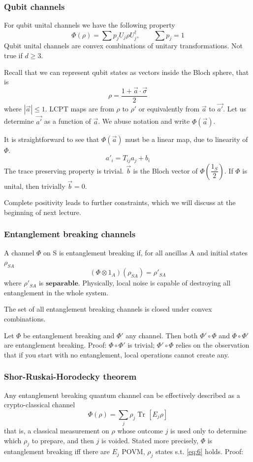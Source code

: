 \documentclass[a4paper, 11pt]{article}
\newcommand{\Tr}{\mathop{\mathrm{Tr}\!}{}}
\begin{document}
	\subsubsection{Qubit channels}
	For qubit unital channels we have the following property
	\[ \Phi(\rho) = \sum p_j U_j \rho U_j^\dagger,\qquad \sum p_j = 1 \]
	Qubit unital channels are convex combinations of unitary transformations. Not true if $d\ge 3$.
	
	Recall that we can represent qubit states as vectors inside the Bloch sphere, that is
	\[ \rho = \dfrac{1+\vec{a}\cdot\vec{\sigma}}{2} \]
	where $|\vec{a}|\le 1$. LCPT maps are from $\rho$ to $\rho'$ or equivalently from $\vec{a}$ to $\vec{a'}$.
	Let us determine $\vec{a'}$ as a function of $\vec{a}$. We abuse notation and write $\Phi(\vec{a})$.
	
	It is straightforward to see that $\Phi(\vec{a})$ must be a linear map, due to linearity of $\Phi$.
	\[ a'_i = T_{ij} a_j + b_i \]
	The trace preserving property is trivial. $\vec{b}$ is the Bloch vector of $\Phi\left(\dfrac{1_S}{2}\right)$. If $\Phi$ is unital, then trivially $\vec{b} = 0$.
	
	Complete positivity leads to further constraints, which we will discuss at the beginning of next lecture.
	
	
	\subsubsection{Entanglement breaking channels}
	A channel $\Phi$ on S is entanglement breaking if, for all ancillas A and initial states $\rho_{SA}$
	\[ (\Phi\otimes 1_A)(\rho_{SA}) = \rho'_{SA} \]
	where $\rho'_{SA}$ is $\mathbf{separable}$. Physically, local noise is capable of destroying all entanglement in the whole system.
	
	The set of all entanglement breaking channels is closed under convex combinations.
	
	Let $\Phi$ be entanglement breaking and $\Phi'$ any channel. Then both $\Phi'\circ \Phi$ and $\Phi\circ \Phi'$ are entanglement breaking. Proof: $\Phi\circ \Phi'$ is trivial; $\Phi'\circ \Phi$ relies on the observation that if you start with no entanglement, local operations cannot create any.
	
	\subsubsection{Shor-Ruskai-Horodecky theorem}
	Any entanglement breaking quantum channel can be effectively described as a crypto-classical channel
	\begin{equation}
	\label{eq:6}
	\Phi(\rho) = \sum_j \rho_j \Tr\left[ E_j \rho \right]
	\end{equation}
	that is, a classical measurement on $\rho$ whose outcome $j$ is used only to determine which $\rho_j$ to prepare, and then $j$ is voided. Stated more precisely, $\Phi$ is entanglement breaking iff there are $E_j$ POVM, $\rho_j$ states s.t. \ref{eq:6} holds. Proof:
	
\end{document}
